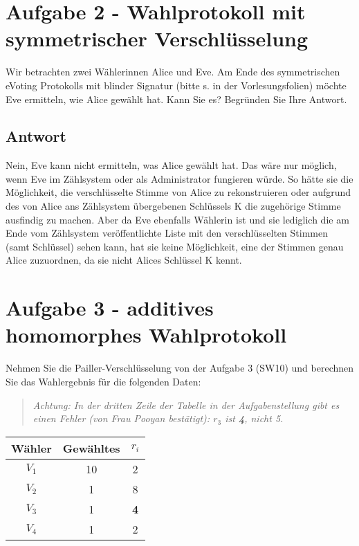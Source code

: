 \documentclass[a4paper]{article}
\begin{document}
\section*{Aufgabe 2 - Wahlprotokoll mit symmetrischer Verschlüsselung}
	
	Wir betrachten zwei Wählerinnen Alice und Eve. Am Ende des symmetrischen eVoting Protokolls mit blinder Signatur (bitte s. in der Vorlesungsfolien) möchte Eve ermitteln, wie Alice gewählt hat. Kann Sie es? Begründen Sie Ihre Antwort.
	
\subsection*{Antwort}

	Nein, Eve kann nicht ermitteln, was Alice gewählt hat. Das wäre nur möglich, wenn Eve im Zählsystem oder als Administrator fungieren würde. So hätte sie die Möglichkeit, die verschlüsselte Stimme von Alice zu rekonstruieren oder aufgrund des von Alice ans Zählsystem übergebenen Schlüssels K die zugehörige Stimme ausfindig zu machen. Aber da Eve ebenfalls Wählerin ist und sie lediglich die am Ende vom Zählsystem veröffentlichte Liste mit den verschlüsselten Stimmen (samt Schlüssel) sehen kann, hat sie keine Möglichkeit, eine der Stimmen genau Alice zuzuordnen, da sie nicht Alices Schlüssel K kennt.
	
	\newpage
	
\section*{Aufgabe 3 - additives homomorphes Wahlprotokoll}

Nehmen Sie die Pailler-Verschlüsselung von der Aufgabe 3 (SW10) und berechnen Sie das Wahlergebnis für die folgenden Daten: 
\begin{quote}
	\textit{Achtung: In der dritten Zeile der Tabelle in der Aufgabenstellung gibt es einen Fehler (von Frau Pooyan bestätigt): $r_{3}$ ist \textbf{4}, nicht 5.}
\end{quote}

\begin{center}
	\begin{tabular}{|c|c|c|}
		\hline
		Wähler & Gewähltes & $r_{i}$ \\ \hline
		$V_{1}$&     10      &  2  \\ \hline
		$V_{2}$&        1   &  8  \\ \hline
		$V_{3}$&         1  &  \textbf{4}  \\ \hline
		$V_{4}$&          1 &  2  \\ \hline
	\end{tabular}
\end{center}
\end{document}
